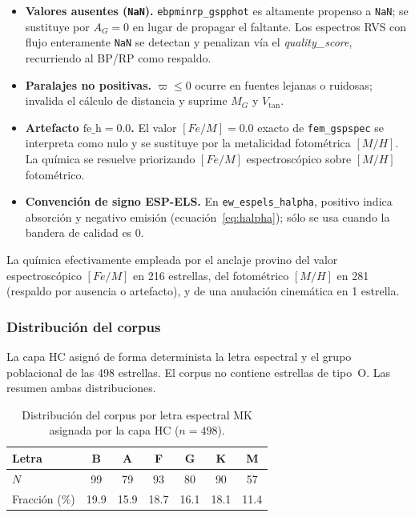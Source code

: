 \begin{itemize}
  \item \textbf{Valores ausentes (\texttt{NaN}).} \verb|ebpminrp_gspphot| es altamente
  propenso a \texttt{NaN}; se sustituye por $A_G = 0$ en lugar de propagar el faltante.
  Los espectros RVS con flujo enteramente \texttt{NaN} se detectan y penalizan vía el
  \emph{quality\_score}, recurriendo al BP/RP como respaldo.
  \item \textbf{Paralajes no positivas.} $\varpi \le 0$ ocurre en fuentes lejanas o
  ruidosas; invalida el cálculo de distancia y suprime $M_G$ y $V_\mathrm{tan}$.
  \item \textbf{Artefacto $\mathrm{fe\_h}=0.0$.} El valor $[Fe/M]=0.0$ exacto de
  \verb|fem_gspspec| se interpreta como nulo y se sustituye por la metalicidad
  fotométrica $[M/H]$. La química se resuelve priorizando $[Fe/M]$ espectroscópico
  sobre $[M/H]$ fotométrico.
  \item \textbf{Convención de signo ESP-ELS.} En \verb|ew_espels_halpha|, positivo
  indica absorción y negativo emisión (ecuación~\eqref{eq:halpha}); sólo se usa cuando
  la bandera de calidad es 0.
\end{itemize}

La química efectivamente empleada por el anclaje provino del valor espectroscópico
$[Fe/M]$ en 216 estrellas, del fotométrico $[M/H]$ en 281 (respaldo por ausencia o
artefacto), y de una anulación cinemática en 1 estrella.

\subsubsection{Distribución del corpus}
\label{sec:datos-distrib}

La capa HC asignó de forma determinista la letra espectral y el grupo poblacional de
las \num{498} estrellas. El corpus no contiene estrellas de tipo~O. Las
 resumen ambas distribuciones.

\begin{table}[H]
  \centering
  \caption{Distribución del corpus por letra espectral MK asignada por la capa HC
  ($n=498$).}
  \label{tab:dist-letra}
  \begin{tabular}{lcccccc}
    \toprule
    Letra & B & A & F & G & K & M \\
    \midrule
    $N$        & 99 & 79 & 93 & 80 & 90 & 57 \\
    Fracción (\%) & 19.9 & 15.9 & 18.7 & 16.1 & 18.1 & 11.4 \\
    \bottomrule
  \end{tabular}
\end{table}


